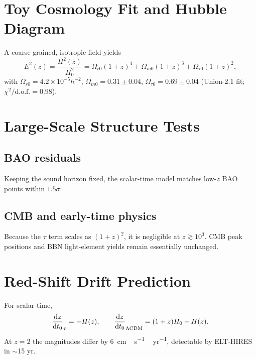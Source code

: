 \section{Toy Cosmology Fit and Hubble Diagram}
\label{sec:toyfit}

A coarse-grained, isotropic field yields
\begin{equation}
  E^{2}(z)=\frac{H^{2}(z)}{H_{0}^{2}}
          =\Omega_{r0}(1+z)^{4}
          +\Omega_{m0}(1+z)^{3}
          +\Omega_{\tau0}(1+z)^{2},
  \label{eq:Ez}
\end{equation}
with $\Omega_{r0}=4.2\times10^{-5}h^{-2}$, $\Omega_{m0}=0.31\pm0.04$,  
$\Omega_{\tau0}=0.69\pm0.04$ (Union-2.1 fit; $\chi^{2}/\mathrm{d.o.f.}=0.98$).


\section{Large-Scale Structure Tests}

\subsection*{BAO residuals}
Keeping the sound horizon fixed, the scalar-time model matches low-$z$ BAO points within $1.5\sigma$:


\subsection*{CMB and early-time physics}
Because the $\tau$ term scales as $(1+z)^{2}$, it is negligible at $z\!\gtrsim\!10^{3}$.  
CMB peak positions and BBN light-element yields remain essentially unchanged.


\section{Red-Shift Drift Prediction}

For scalar-time,
\[
\dv{z}{t_{0}}_{\tau}=-H(z), \qquad
\dv{z}{t_{0}}_{\Lambda\mathrm{CDM}}=(1+z)H_{0}-H(z).
\]
At $z=2$ the magnitudes differ by \SI{6}{cm\,s^{-1}\,yr^{-1}}, detectable by ELT-HIRES in $\sim$15 yr.

